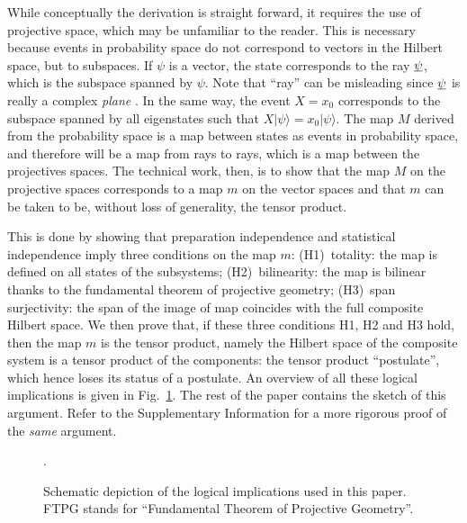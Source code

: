 \documentclass[aps,prl,amsmath,amssymb,twocolumn,nofootinbib]{revtex4}
\theoremstyle{plain}
\theoremstyle{definition}
\theoremstyle{remark}
\newcommand{\pj}[1] {\underbar{$#1$}}
\def\>{\rangle}
\begin{document}
	While conceptually the derivation is straight forward, it requires the
	use of projective space, which may be unfamiliar to the reader. This is
	necessary because events in probability space do not correspond to vectors in the Hilbert space, but to subspaces. If $\psi$ is a vector, the state corresponds to the ray $\pj{\psi}$, which is the subspace spanned by $\psi$. Note that ``ray'' can be misleading since $\pj{\psi}$ is really a complex { \em plane }. In the same way, the event $X = x_0$ corresponds to the subspace spanned by all eigenstates such that $X | \psi \> = x_0 |\psi\>$. The map $M$ derived from the probability space is a map between states as events in probability space, and therefore will be a map from rays to rays, which is a map between the projectives spaces. The technical work, then, is to show that the map $M$ on the projective spaces corresponds to a map $m$ on the vector spaces and that $m$ can be taken to be, without loss of generality, the tensor product.
	
	This is done by showing that preparation independence and
	statistical independence imply three conditions on the map $m$:
	(H1)~totality: the map is defined on all states of the subsystems;
	(H2)~bilinearity: the map is bilinear thanks to the fundamental
	theorem of projective geometry; (H3)~span surjectivity: the span of
	the image of map coincides with the full composite Hilbert space.  We
	then prove that, if these three conditions H1, H2 and H3 hold, then
	the map $m$ is the tensor product, namely the Hilbert space of the
	composite system is a tensor product of the components: the tensor
	product ``postulate'', which hence loses its status of a postulate. An
	overview of all these logical implications is given in
	Fig.~\ref{f:fig}. The rest of the paper contains the sketch of this
	argument. Refer to the Supplementary Information for a more rigorous
	proof of the \emph{same} argument.
	
	\begin{figure}[ht]
		.\hsize\leavevmode{}
		\caption{Schematic depiction of the logical implications used
			in this paper. FTPG stands for ``Fundamental Theorem of Projective Geometry''.  \label{f:fig}}\end{figure}
	
\end{document}
